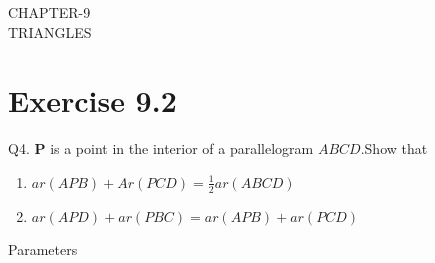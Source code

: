 \documentclass{article}
\let\vec\mathbf
\begin{document}
\begin{center}
        \textbf\large{CHAPTER-9 \\ TRIANGLES}
\end{center}
\section{Exercise 9.2}
Q4. $\vec{P}$ is a point in the interior of a parallelogram $ABCD$.Show that
\begin{enumerate} 
\item $ar(APB)+Ar(PCD) = \frac{1}{2}ar(ABCD)$
\item $ar(APD)+ar(PBC) = ar(APB)+ar(PCD)$   
\end{enumerate}	

\begin{table}[h]
	  \centering
	  
	  \caption{Parameters}
	  \label{tab:Table1}
\end{table}
\end{document}
